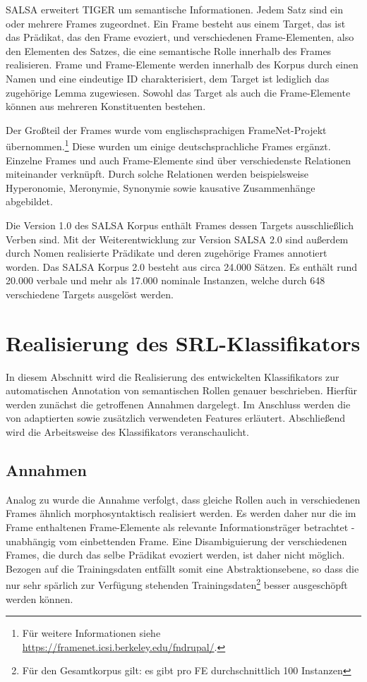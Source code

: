 \documentclass[12pt]{article}
\begin{document}
SALSA erweitert TIGER um semantische Informationen. Jedem Satz sind ein oder mehrere Frames zugeordnet. Ein Frame besteht aus einem Target, das ist das Prädikat, das den Frame evoziert, und verschiedenen Frame-Elementen, also den Elementen des Satzes, die eine semantische Rolle innerhalb des Frames realisieren. Frame und Frame-Elemente werden innerhalb des Korpus durch einen Namen und eine eindeutige ID charakterisiert, dem Target ist lediglich das zugehörige Lemma zugewiesen. Sowohl das Target als auch die Frame-Elemente können aus mehreren Konstituenten bestehen.

Der Großteil der Frames wurde vom englischsprachigen FrameNet-Projekt\citep{baker_berkeley_1998} übernommen.\footnote{Für weitere Informationen siehe \url{https://framenet.icsi.berkeley.edu/fndrupal/}.} Diese wurden um einige deutschsprachliche Frames ergänzt. Einzelne Frames und auch Frame-Elemente sind über verschiedenste Relationen miteinander verknüpft. Durch solche Relationen werden beispielsweise Hyperonomie, Meronymie, Synonymie sowie kausative Zusammenhänge abgebildet.

Die Version 1.0 des SALSA Korpus\citep{burchardt_salsa_2006} enthält Frames dessen Targets ausschließlich Verben sind. Mit der Weiterentwicklung zur Version SALSA 2.0\citep{rehbein_adding_2012} sind außerdem durch Nomen realisierte Prädikate und deren zugehörige Frames annotiert worden. Das SALSA Korpus 2.0 besteht aus circa 24.000 Sätzen. Es enthält rund 20.000 verbale und mehr als 17.000 nominale Instanzen, welche durch 648 verschiedene Targets ausgelöst werden.

\section{Realisierung des SRL-Klassifikators}
In diesem Abschnitt wird die Realisierung des entwickelten Klassifikators zur automatischen Annotation von semantischen Rollen genauer beschrieben. Hierfür werden zunächst die getroffenen Annahmen dargelegt. Im Anschluss werden die von \cite{gildea} adaptierten sowie zusätzlich verwendeten Features erläutert. Abschließend wird die Arbeitsweise des Klassifikators veranschaulicht.

\subsection{Annahmen}

Analog zu \cite{gildea} wurde die Annahme verfolgt, dass gleiche Rollen auch in verschiedenen Frames ähnlich morphosyntaktisch realisiert werden. Es werden daher nur die im Frame enthaltenen Frame-Elemente als relevante Informationsträger betrachtet - unabhängig vom einbettenden Frame. Eine Disambiguierung der verschiedenen Frames, die durch das selbe Prädikat evoziert werden, ist daher nicht möglich. Bezogen auf die Trainingsdaten entfällt somit eine Abstraktionsebene, so dass die nur sehr spärlich zur Verfügung stehenden Trainingsdaten\footnote{Für den Gesamtkorpus gilt: es gibt pro FE durchschnittlich 100 Instanzen} besser ausgeschöpft werden können.
\end{document}
